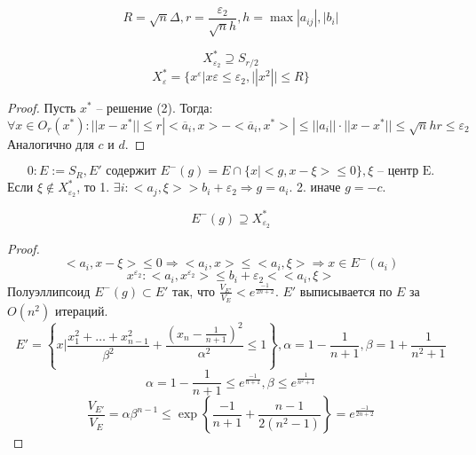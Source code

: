 \documentclass[11pt]{article}
\newcounter{th}\setcounter{th}{0}
\newcounter{stnmt}\setcounter{stnmt}{0}
\def\st{\par\smallskip\refstepcounter{stnmt}\textbf{\arabic{stnmt}}}
\newtheorem*{Statement}{Утверждение \st}
\begin{document}
\begin{equation}
R = \sqrt{n}\Delta, r = \frac{\varepsilon_2}{\sqrt{n}h}, h = \max{|a_{ij}|, |b_i|}
\end{equation}
\begin{Statement}
\begin{equation}
X^*_{\varepsilon_2} \supseteq S_{r/2}
\end{equation}
\begin{equation}
X_{\varepsilon}^* = \{x^{\varepsilon} | x \varepsilon \leq \varepsilon_2, ||x^2|| \leq R\}
\end{equation}
\end{Statement}
\begin{proof}
Пусть $x^*$ -- решение (2). Тогда:
\begin{equation}
\forall x \in O_r(x^*): ||x - x^*|| \leq r |<\overline{a}_i, x> - <\overline{a}_i, x^*>|
\leq ||a_i||\cdot||x - x^*|| \leq \sqrt{n}hr \leq \varepsilon_2
\end{equation}
Аналогично для $c$ и $d$.
\end{proof}
\begin{equation}
0: E := S_R, E' \text{ содержит } E^-(g) = E \cap \{x | <g, x - \xi> \leq 0\}, \xi \text{ -- центр E.}
\end{equation}
Если $\xi \notin X^*_{\varepsilon_2}$, то
1. $\exists i: <a_j, \xi> > b_i + \varepsilon_2 \Rightarrow g = a_i$.
2. иначе $g = -c$.
\begin{Statement}
\begin{equation*}
E^-(g) \supseteq  X^*_{\varepsilon_2}
\end{equation*}
\end{Statement}
\begin{proof}
\begin{equation}
<a_i, x - \xi> \leq 0 \Rightarrow <a_i, x> \leq <a_i, \xi> \Rightarrow x \in E^-(a_i)
\end{equation}
\begin{equation}
x^{\varepsilon_2}: <a_i, x^{\varepsilon_2}> \leq b_i + \varepsilon_2 < <a_i, \xi>
\end{equation}
Полуэллипсоид $E^-(g) \subset E'$ так, что $\frac{V_{E'}}{V_E} < e^{\frac{-1}{2n + 2}}$.
$E'$ выписывается по $E$ за $O(n^2)$ итераций.
\begin{equation}
E' = \left\{x | \frac{x_1^2 + \ldots + x_{n - 1}^2}{\beta^2} + \frac{(x_n - \frac1{n + 1})^2}{\alpha^2} \leq 1\right\},
\alpha = 1 - \frac1{n + 1}, \beta = 1 + \frac1{n^2 + 1}
\end{equation}
\begin{equation}
\alpha = 1 - \frac1{n + 1} \leq e^{\frac{-1}{n + 1}}, \beta \leq e^{\frac1{n^2 + 1}}
\end{equation}
\begin{equation}
\frac{V_{E'}}{V_E} = \alpha\beta^{n - 1} \leq \exp\left\{\frac{-1}{n + 1} + \frac{n - 1}{2(n^2 - 1)}\right\} = e^{\frac{-1}{2n + 2}}
\end{equation}
\end{proof}
\end{document}

